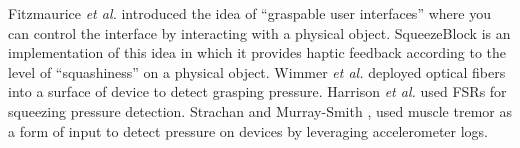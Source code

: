 \par
Fitzmaurice \emph{et al.} \cite{Fitzmaurice:1995:BLF} introduced the idea of ``graspable user interfaces'' where you can control the interface by interacting with a physical object. SqueezeBlock \cite{Gupta:2010:SUV} is an implementation of this idea in which it provides haptic feedback according to the level of ``squashiness'' on a physical object. Wimmer \emph{et al.} \cite{Wimmer:2010:FGS} deployed optical fibers into a surface of device to detect grasping pressure. Harrison \emph{et al.} \cite{harrison:1998:squeeze} used FSRs for squeezing pressure detection. Strachan and Murray-Smith \cite{Strachan:2004:MTI}, used muscle tremor as a form of input to detect pressure on devices by leveraging accelerometer logs. 